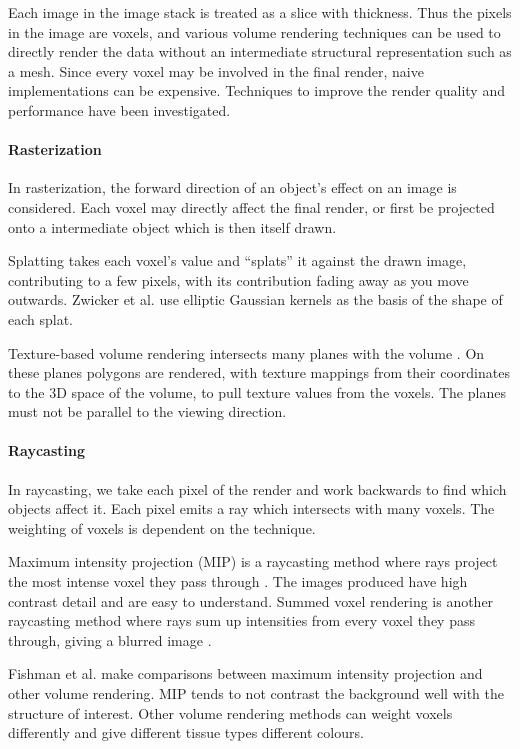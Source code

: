 \documentclass[11p, titlepage]{article}
\begin{document}
Each image in the image stack is treated as a slice with thickness. Thus the pixels in the image are voxels, and various volume rendering techniques can be used to directly render the data without an intermediate structural representation such as a mesh. Since every voxel may be involved in the final render, naive implementations can be expensive. Techniques to improve the render quality and performance have been investigated.

\paragraph{Rasterization}

In rasterization, the forward direction of an object's effect on an image is considered. Each voxel may directly affect the final render, or first be projected onto a intermediate object which is then itself drawn.

Splatting takes each voxel's value and ``splats'' it against the drawn image, contributing to a few pixels, with its contribution fading away as you move outwards. Zwicker et al. \cite{zwicker2002ewa} use elliptic Gaussian kernels as the basis of the shape of each splat.

Texture-based volume rendering intersects many planes with the volume \cite{ohiotexture}. On these planes polygons are rendered, with texture mappings from their coordinates to the 3D space of the volume, to pull texture values from the voxels. The planes must not be parallel to the viewing direction.

\paragraph{Raycasting}

In raycasting, we take each pixel of the render and work backwards to find which objects affect it. Each pixel emits a ray which intersects with many voxels. The weighting of voxels is dependent on the technique.

Maximum intensity projection (MIP) is a raycasting method where rays project the most intense voxel they pass through \cite{birkfellner2016applied}. The images produced have high contrast detail and are easy to understand. Summed voxel rendering is another raycasting method where rays sum up intensities from every voxel they pass through, giving a blurred image \cite{birkfellner2016applied}.

Fishman et al. \cite{fishman2006volume} make comparisons between maximum intensity projection and other volume rendering. MIP tends to not contrast the background well with the structure of interest. Other volume rendering methods can weight voxels differently and give different tissue types different colours. 
\end{document}
